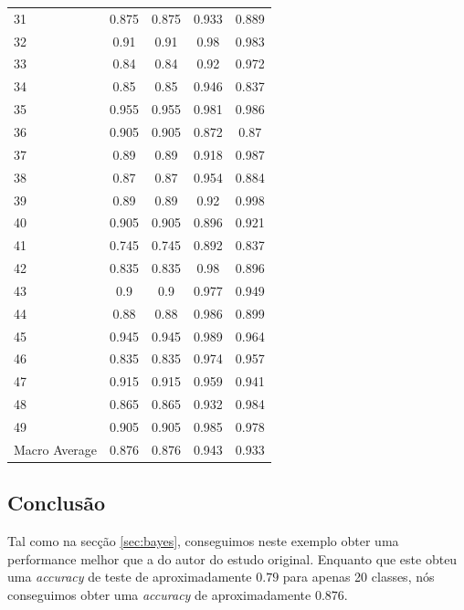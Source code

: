 \begin{table}[!t]
\begin{center}
\begin{tabular}{l c c c c}
31 & 0.875 & 0.875 & 0.933 & 0.889\\
32 & 0.91 & 0.91 & 0.98 & 0.983\\
33 & 0.84 & 0.84 & 0.92 & 0.972\\
34 & 0.85 & 0.85 & 0.946 & 0.837\\
35 & 0.955 & 0.955 & 0.981 & 0.986\\
36 & 0.905 & 0.905 & 0.872 & 0.87\\
37 & 0.89 & 0.89 & 0.918 & 0.987\\
38 & 0.87 & 0.87 & 0.954 & 0.884\\
39 & 0.89 & 0.89 & 0.92 & 0.998\\
40 & 0.905 & 0.905 & 0.896 & 0.921\\
41 & 0.745 & 0.745 & 0.892 & 0.837\\
42 & 0.835 & 0.835 & 0.98 & 0.896\\
43 & 0.9 & 0.9 & 0.977 & 0.949\\
44 & 0.88 & 0.88 & 0.986 & 0.899\\
45 & 0.945 & 0.945 & 0.989 & 0.964\\
46 & 0.835 & 0.835 & 0.974 & 0.957\\
47 & 0.915 & 0.915 & 0.959 & 0.941\\
48 & 0.865 & 0.865 & 0.932 & 0.984\\
49 & 0.905 & 0.905 & 0.985 & 0.978\\
\hline
Macro Average & 0.876 & 0.876 & 0.943 & 0.933\\
\end{tabular}
\label{tab:logistic_perforamnce}
\end{center}
\end{table}


\subsection{Conclusão}
Tal como na secção \ref{sec:bayes}, conseguimos neste exemplo obter uma performance melhor que a do autor do estudo original. Enquanto que este obteu uma \textit{accuracy} de teste de aproximadamente $0.79$ para apenas 20 classes, nós conseguimos obter uma \textit{accuracy} de aproximadamente $0.876$.
